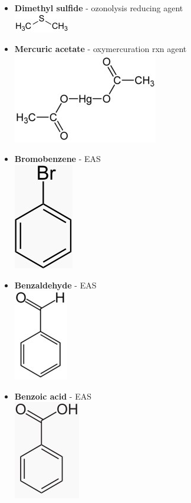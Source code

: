 \documentclass[10pt,landscape]{article}
\begin{document}
\begin{multicols*}{3}
\begin{scriptsize}
\begin{itemize}
    \item \textbf{Dimethyl sulfide} - ozonolysis reducing agent\\
      \includegraphics[scale=0.25]{allowed/dimethylS.jpg}
    \item \textbf{Mercuric acetate} - oxymercuration rxn agent\\
      \includegraphics[scale=0.25]{allowed/hgoac2.jpg}
    \item \textbf{Bromobenzene} - EAS\\
      \includegraphics[scale=0.25]{allowed/bromobenzene.jpg}
    \item \textbf{Benzaldehyde} - EAS\\
      \includegraphics[scale=0.25]{allowed/benzaldehyde.jpg}
    \item \textbf{Benzoic acid} - EAS\\
      \includegraphics[scale=0.25]{allowed/benzoicacid.jpg}

\end{itemize}
\end{scriptsize}
\end{multicols*}
\end{document}
